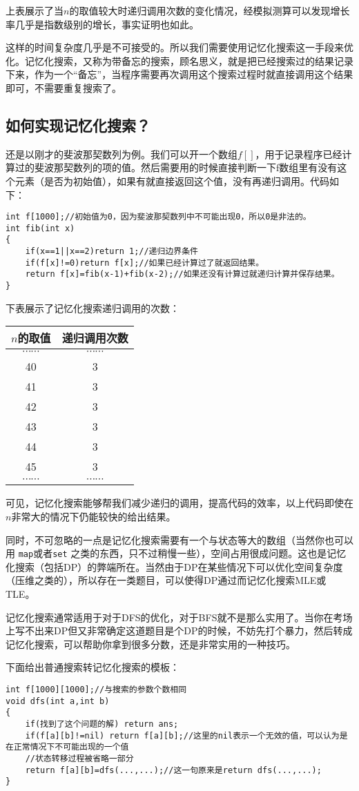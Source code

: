 上表展示了当$n$的取值较大时递归调用次数的变化情况，经模拟测算可以发现增长率几乎是指数级别的增长，事实证明也如此。

这样的时间复杂度几乎是不可接受的。所以我们需要使用记忆化搜索这一手段来优化。记忆化搜索，又称为带备忘的搜索，顾名思义，就是把已经搜索过的结果记录下来，作为一个“备忘”，当程序需要再次调用这个搜索过程时就直接调用这个结果即可，不需要重复搜索了。
\subsection{如何实现记忆化搜索？}
还是以刚才的斐波那契数列为例。我们可以开一个数组$f[]$，用于记录程序已经计算过的斐波那契数列的项的值。然后需要用的时候直接判断一下f数组里有没有这个元素（是否为初始值），如果有就直接返回这个值，没有再递归调用。代码如下：
\begin{verbatim}
int f[1000];//初始值为0，因为斐波那契数列中不可能出现0，所以0是非法的。
int fib(int x)
{
    if(x==1||x==2)return 1;//递归边界条件
    if(f[x]!=0)return f[x];//如果已经计算过了就返回结果。
    return f[x]=fib(x-1)+fib(x-2);//如果还没有计算过就递归计算并保存结果。
}
\end{verbatim}

下表展示了记忆化搜索递归调用的次数：
\begin{center}
\begin{tabular}{|c|c|}
\hline
$n$的取值&递归调用次数\\
\hline
$\cdots\cdots$&$\cdots\cdots$\\
\hline
40&3\\
\hline
41&3\\
\hline
42&3\\
\hline
43&3\\
\hline
44&3\\
\hline
45&3\\
\hline
$\cdots\cdots$&$\cdots\cdots$\\
\hline
\end{tabular}
\end{center}
可见，记忆化搜索能够帮我们减少递归的调用，提高代码的效率，以上代码即使在$n$非常大的情况下仍能较快的给出结果。

同时，不可忽略的一点是记忆化搜索需要有一个与状态等大的数组（当然你也可以用 \verb+map+或者\verb+set+ 之类的东西，只不过稍慢一些），空间占用很成问题。这也是记忆化搜索（包括DP）的弊端所在。当然由于DP在某些情况下可以优化空间复杂度（压维之类的），所以存在一类题目，可以使得DP通过而记忆化搜索MLE或TLE。

记忆化搜索通常适用于对于DFS的优化，对于BFS就不是那么实用了。当你在考场上写不出来DP但又非常确定这道题目是个DP的时候，不妨先打个暴力，然后转成记忆化搜索，可以帮助你拿到很多分数，还是非常实用的一种技巧。

下面给出普通搜索转记忆化搜索的模板：
\begin{verbatim}
int f[1000][1000];//与搜索的参数个数相同
void dfs(int a,int b)
{
    if(找到了这个问题的解) return ans;
    if(f[a][b]!=nil) return f[a][b];//这里的nil表示一个无效的值，可以认为是在正常情况下不可能出现的一个值
    //状态转移过程被省略一部分
    return f[a][b]=dfs(...,...);//这一句原来是return dfs(...,...);
}
\end{verbatim}
\note